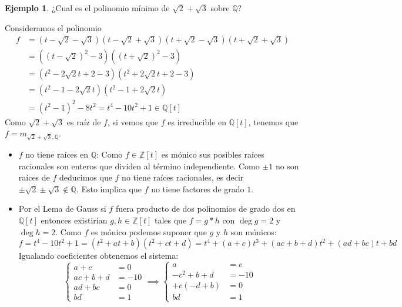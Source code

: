\documentclass[10pt, spanish]{report}
\theoremstyle{definition}
\newtheorem*{ej}{Ejemplo}
\newcommand{\Z}{\mathbb{Z}}
\newcommand{\Q}{\mathbb{Q}}
\begin{document}
\begin{ej}
    ¿Cual es el polinomio mínimo de $\sqrt{2}+\sqrt{3}$ sobre $\Q$?

    Consideramos el polinomio
    \begin{align*}
        f&=(t-\sqrt{2}-\sqrt{3})(t-\sqrt{2}+\sqrt{3})(t+\sqrt{2}-\sqrt{3})(t+\sqrt{2}+\sqrt{3})\\
         &=((t-\sqrt{2})^2-3) ((t+\sqrt{2})^2-3)\\
         &=(t^2-2\sqrt{2}t+2-3)(t^2+2\sqrt{2}t+2-3)\\
         &=(t^2-1-2\sqrt{2}t)(t^2-1+2\sqrt{2}t)\\
         &=(t^2-1)^2-8t^2=t^4-10t^2+1\in\Q[t]
    \end{align*}
    Como $\sqrt{2}+\sqrt{3}$ es raíz de $f$, si vemos que $f$ es irreducible en
    $\Q[t]$, tenemos que $f=m_{\sqrt{2}+\sqrt{3},\Q}$.
    \begin{itemize}
        \item $f$ no tiene raíces en $\Q$: Como $f\in\Z[t]$ es mónico sus
            posibles raíces racionales son enteros que dividen al término
            independiente. Como $\pm1$ no son raíces de $f$ deducimos que $f$ no
            tiene raíces racionales, es decir $\pm\sqrt{2}\pm\sqrt{3}\not\in\Q$.
            Esto implica que $f$ no tiene factores de grado $1$.
        \item Por el Lema de Gauss si $f$ fuera producto de dos polinomios de
            grado dos en $\Q[t]$ entonces existirían $g,h\in\Z[t]$ tales que
            $f=g*h$ con $\deg{g}=2$ y $\deg{h}=2$. Como $f$ es mónico podemos
            suponer que $g$ y $h$ son mónicos:
            \[f=t^4-10t^2+1=(t^2+at+b)(t^2+ct+d)=t^4+(a+c)t^3+(ac+b+d)t^2+(ad+bc)t+bd\]
            Igualando coeficientes obtenemos el sistema:
            \[
                \begin{cases}
                    a+c &= 0\\
                    ac+b+d &= -10\\
                    ad+bc&=0\\
                    bd&=1
                \end{cases}
                \implies
                \begin{cases}
                    a&=c\\
                    -c^2+b+d&=-10\\
                    +c(-d+b)&=0\\
                    bd&=1
                \end{cases}
\]
\end{itemize}
\end{ej}
\end{document}
